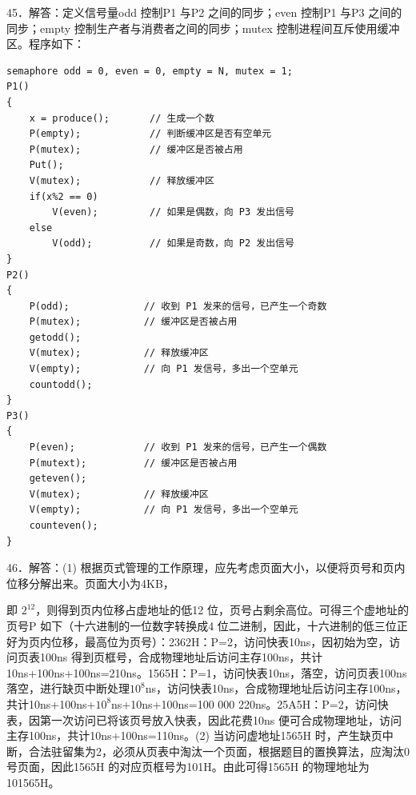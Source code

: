 \documentclass[UTF8,11pt]{ctexart}
\begin{document}
45．解答：定义信号量odd 控制P1 与P2 之间的同步；even 控制P1 与P3 之间的同步；empty 控制生产者与消费者之间的同步；mutex 控制进程间互斥使用缓冲区。程序如下：


\begin{Verbatim}[breaklines,breakanywhere,fontsize=\small]
semaphore odd = 0, even = 0, empty = N, mutex = 1;
P1()
{
    x = produce();       // 生成一个数
    P(empty);            // 判断缓冲区是否有空单元
    P(mutex);            // 缓冲区是否被占用
    Put();
    V(mutex);            // 释放缓冲区
    if(x%2 == 0)
        V(even);         // 如果是偶数，向 P3 发出信号
    else
        V(odd);          // 如果是奇数，向 P2 发出信号
}
P2()
{
    P(odd);             // 收到 P1 发来的信号，已产生一个奇数
    P(mutex);           // 缓冲区是否被占用
    getodd();
    V(mutex);           // 释放缓冲区
    V(empty);           // 向 P1 发信号，多出一个空单元
    countodd();
}
P3()
{
    P(even);            // 收到 P1 发来的信号，已产生一个偶数
    P(mutext);          // 缓冲区是否被占用
    geteven();
    V(mutex);           // 释放缓冲区
    V(empty);           // 向 P1 发信号，多出一个空单元
    counteven();
}
\end{Verbatim}

46．解答：(1) 根据页式管理的工作原理，应先考虑页面大小，以便将页号和页内位移分解出来。页面大小为4KB，


即 \(\displaystyle 2^{12}\)，则得到页内位移占虚地址的低12 位，页号占剩余高位。可得三个虚地址的页号P 如下（十六进制的一位数字转换成4 位二进制，因此，十六进制的低三位正好为页内位移，最高位为页号）：2362H：P=2，访问快表10ns，因初始为空，访问页表100ns 得到页框号，合成物理地址后访问主存100ns，共计10ns+100ns+100ns=210ns。1565H：P=1，访问快表10ns，落空，访问页表100ns 落空，进行缺页中断处理\(\displaystyle 10^8\)ns，访问快表10ns，合成物理地址后访问主存100ns，共计10ns+100ns+\(\displaystyle 10^8\)ns+10ns+100ns=100 000 220ns。25A5H：P=2，访问快表，因第一次访问已将该页号放入快表，因此花费10ns 便可合成物理地址，访问主存100ns，共计10ns+100ns=110ns。(2) 当访问虚地址1565H 时，产生缺页中断，合法驻留集为2，必须从页表中淘汰一个页面，根据题目的置换算法，应淘汰0 号页面，因此1565H 的对应页框号为101H。由此可得1565H 的物理地址为101565H。
\end{document}
